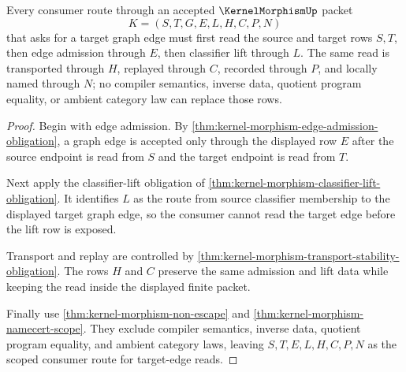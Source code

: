 \begin{theorem}
\label{thm:kernel-morphism-scoped-edge-lift-consumer}
Every consumer route through an accepted $\KernelMorphismUp$ packet
$$
K=(S,T,G,E,L,H,C,P,N)
$$
that asks for a target graph edge must first read the source and target rows $S,T$, then edge admission through $E$, then classifier lift through $L$. The same read is transported through $H$, replayed through $C$, recorded through $P$, and locally named through $N$; no compiler semantics, inverse data, quotient program equality, or ambient category law can replace those rows.
\end{theorem}
\begin{proof}
Begin with edge admission. By \autoref{thm:kernel-morphism-edge-admission-obligation}, a graph edge is accepted only through the displayed row $E$ after the source endpoint is read from $S$ and the target endpoint is read from $T$.

Next apply the classifier-lift obligation of \autoref{thm:kernel-morphism-classifier-lift-obligation}. It identifies $L$ as the route from source classifier membership to the displayed target graph edge, so the consumer cannot read the target edge before the lift row is exposed.

Transport and replay are controlled by \autoref{thm:kernel-morphism-transport-stability-obligation}. The rows $H$ and $C$ preserve the same admission and lift data while keeping the read inside the displayed finite packet.

Finally use \autoref{thm:kernel-morphism-non-escape} and \autoref{thm:kernel-morphism-namecert-scope}. They exclude compiler semantics, inverse data, quotient program equality, and ambient category laws, leaving $S,T,E,L,H,C,P,N$ as the scoped consumer route for target-edge reads.
\end{proof}

